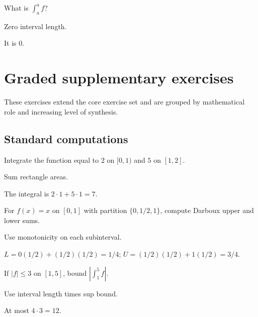 \begin{exercise}\label{exr:ii10-08}
What is $\int_a^a f$?
\end{exercise}
\begin{hint}
Zero interval length.
\end{hint}
\begin{solution}
It is $0$.
\end{solution}


\section{Graded supplementary exercises}
These exercises extend the core exercise set and are grouped by mathematical role and increasing level of synthesis.

\subsection*{Standard computations}

\begin{exercise}\label{exr:ii10-expand-01}
Integrate the function equal to \(2\) on \([0,1)\) and \(5\) on \([1,2]\).
\end{exercise}
\begin{hint}
Sum rectangle areas.
\end{hint}
\begin{solution}
The integral is \(2\cdot1+5\cdot1=7\).
\end{solution}

\begin{exercise}\label{exr:ii10-expand-02}
For \(f(x)=x\) on \([0,1]\) with partition \(\{0,1/2,1\}\), compute Darboux upper and lower sums.
\end{exercise}
\begin{hint}
Use monotonicity on each subinterval.
\end{hint}
\begin{solution}
\(L=0(1/2)+(1/2)(1/2)=1/4\); \(U=(1/2)(1/2)+1(1/2)=3/4\).
\end{solution}

\begin{exercise}\label{exr:ii10-expand-03}
If \(|f|\le3\) on \([1,5]\), bound \(|\int_1^5f|\).
\end{exercise}
\begin{hint}
Use interval length times sup bound.
\end{hint}
\begin{solution}
At most \(4\cdot3=12\).
\end{solution}

